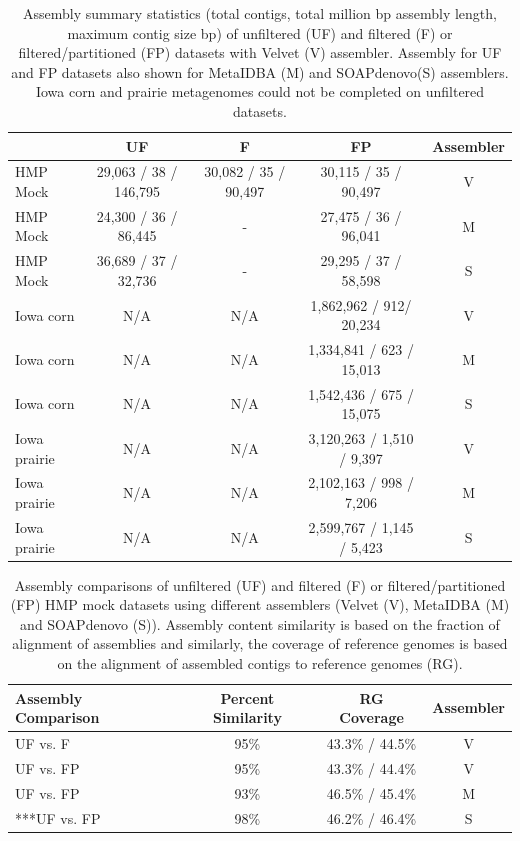\documentclass[11pt]{article} %
\begin{document}
\begin{table}[ht]
\caption{Assembly summary statistics (total contigs, total million bp assembly length, maximum contig size bp) of unfiltered (UF) and filtered (F) or filtered/partitioned (FP) datasets with Velvet (V) assembler.  Assembly for UF and FP datasets also shown for MetaIDBA (M) and SOAPdenovo(S) assemblers.  Iowa corn and prairie metagenomes could not be completed on unfiltered datasets.}
\begin{tabular}{l c c c c}
& UF & F & FP & Assembler \\
\hline
HMP Mock & 29,063 / 38 / 146,795 & 30,082 / 35 / 90,497 & 30,115 / 35 / 90,497 & V \\
HMP Mock & 24,300 / 36  / 86,445 & - & 27,475 / 36 / 96,041 & M \\
HMP Mock & 36,689 / 37 / 32,736 & - & 29,295 / 37 / 58,598 & S \\
Iowa corn & N/A & N/A & 1,862,962 / 912/ 20,234 & V \\
Iowa corn & N/A & N/A & 1,334,841 / 623 / 15,013 & M \\
Iowa corn & N/A & N/A & 1,542,436 / 675 / 15,075 & S \\
Iowa prairie & N/A & N/A & 3,120,263 / 1,510 / 9,397 & V \\
Iowa prairie & N/A & N/A & 2,102,163 / 998 / 7,206 & M \\
Iowa prairie & N/A & N/A & 2,599,767 / 1,145 / 5,423 & S \\
\end{tabular}
\label{assembly-summary}
\end{table}

\begin{table}[ht]
\caption{Assembly comparisons of unfiltered (UF) and filtered (F) or filtered/partitioned (FP) HMP mock datasets using different assemblers (Velvet (V), MetaIDBA (M) and SOAPdenovo (S)).  Assembly content similarity is based on the fraction of alignment of assemblies and similarly, the coverage of reference genomes is based on the alignment of assembled contigs to reference genomes (RG).}
\begin{tabular}{l c c c}
Assembly Comparison & Percent Similarity & RG Coverage & Assembler \\
\hline
UF vs. F & 95\% & 43.3\% / 44.5\% & V \\
UF vs. FP & 95\% & 43.3\% / 44.4\% & V\\
UF vs. FP & 93\% & 46.5\% / 45.4\% & M\\ 
***UF vs. FP & 98\% &  46.2\% / 46.4\% & S\\
\end{tabular}
\label{assembly-compare}
\end{table}
\end{document}
